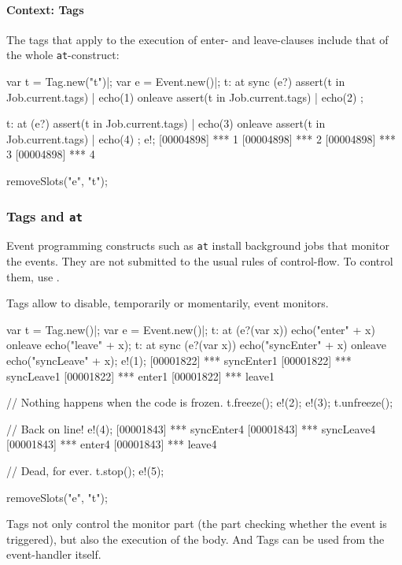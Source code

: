 \paragraph{Context: Tags}
The tags that apply to the execution of enter- and leave-clauses include
that of the whole \lstinline{at}-construct:
\begin{urbiscript}
var t = Tag.new("t")|;
var e = Event.new()|;
t: at sync (e?) { assert(t in Job.current.tags) | echo(1) }
      onleave   { assert(t in Job.current.tags) | echo(2) };

t: at (e?)      { assert(t in Job.current.tags) | echo(3) }
   onleave      { assert(t in Job.current.tags) | echo(4) };
e!;
[00004898] *** 1
[00004898] *** 2
[00004898] *** 3
[00004898] *** 4
\end{urbiscript}
\begin{urbicomment}
removeSlots("e", "t");
\end{urbicomment}

\subsubsection{Tags and \lstinline{at}}
\label{sec:lang:at:tag}

Event programming constructs such as \lstinline{at} install background jobs
that monitor the events.  They are not submitted to the usual rules of
control-flow.  To control them, use .

Tags allow to disable, temporarily or momentarily, event monitors.
\begin{urbiscript}
var t = Tag.new()|;
var e = Event.new()|;
t: at (e?(var x))      echo("enter" + x)     onleave echo("leave" + x);
t: at sync (e?(var x)) echo("syncEnter" + x) onleave echo("syncLeave" + x);
e!(1);
[00001822] *** syncEnter1
[00001822] *** syncLeave1
[00001822] *** enter1
[00001822] *** leave1

// Nothing happens when the code is frozen.
t.freeze();
e!(2);
e!(3);
t.unfreeze();

// Back on line!
e!(4);
[00001843] *** syncEnter4
[00001843] *** syncLeave4
[00001843] *** enter4
[00001843] *** leave4

// Dead, for ever.
t.stop();
e!(5);
\end{urbiscript}
\begin{urbicomment}
removeSlots("e", "t");
\end{urbicomment}

Tags not only control the monitor part (the part checking whether the event
is triggered), but also the execution of the body.  And Tags can be
used from the event-handler itself.

